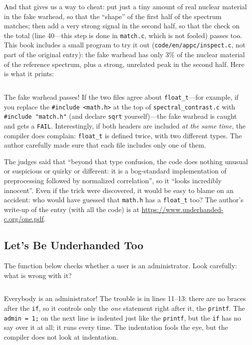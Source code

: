 And that gives us a way to cheat: put just a tiny amount of real nuclear material in the fake warhead, so that the ``shape'' of the first half of the spectrum matches; then add a very strong signal in the second half, so that the check on the total (line 40---this step is done in \texttt{match.c}, which is not fooled) passes too. This book includes a small program to try it out (\texttt{code/en/appc/inspect.c}, not part of the original entry): the fake warhead has only 3\% of the nuclear material of the reference spectrum, plus a strong, unrelated peak in the second half. Here is what it prints:
\inputminted[linenos=false]{text}{code/en/appc/out/inspect.txt}

The fake warhead passes! If the two files agree about \texttt{float\_t}---for example, if you replace the \texttt{\#include <math.h>} at the top of \texttt{spectral\_contrast.c} with \texttt{\#include "match.h"} (and declare \texttt{sqrt} yourself)---the fake warhead is caught and gets a \texttt{FAIL}. Interestingly, if both headers are included \emph{at the same time}, the compiler does complain: \texttt{float\_t} is defined twice, with two different types. The author carefully made sure that each file includes only one of them.

The judges said that ``beyond that type confusion, the code does nothing unusual or suspicious or quirky or different: it is a bog-standard implementation of preprocessing followed by normalized correlation'', so it ``looks incredibly innocent''. Even if the trick were discovered, it would be easy to blame on an accident: who would have guessed that \texttt{math.h} has a \texttt{float\_t} too? The author's write-up of the entry (with all the code) is at \url{https://www.underhanded-c.org/one.pdf}.

\subsection{Let's Be Underhanded Too}

The function below checks whether a user is an administrator. Look carefully: what is wrong with it?


\inputminted[linenos=false]{text}{code/en/appc/out/admin.txt}

Everybody is an administrator! The trouble is in lines 11--13: there are no braces after the \texttt{if}, so it controls only the \emph{one} statement right after it, the \texttt{printf}. The \texttt{admin = 1;} on the next line is indented just like the \texttt{printf}, but the \texttt{if} has no say over it at all; it runs every time. The indentation fools the eye, but the compiler does not look at indentation.

